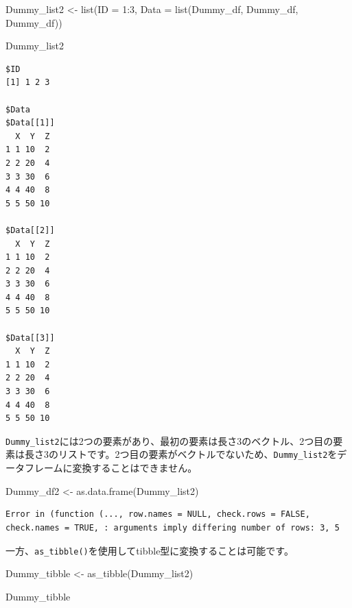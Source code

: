 \documentclass[
  a4paper,
  pandoc,
  ja=standard,
  jafont=haranoaji]{bxjsbook}
\newenvironment{Shaded}{\begin{snugshade}}{\end{snugshade}}
\newcommand{\AttributeTok}[1]{\textcolor[rgb]{0.00,0.48,0.65}{#1}}
\newcommand{\DecValTok}[1]{\textcolor[rgb]{0.68,0.00,0.00}{#1}}
\newcommand{\FunctionTok}[1]{\textcolor[rgb]{0.28,0.35,0.67}{#1}}
\newcommand{\NormalTok}[1]{\textcolor[rgb]{0.00,0.48,0.65}{#1}}
\newcommand{\OtherTok}[1]{\textcolor[rgb]{0.00,0.48,0.65}{#1}}
\newcommand{\SpecialCharTok}[1]{\textcolor[rgb]{0.37,0.37,0.37}{#1}}
\begin{document}
\begin{Shaded}
\begin{Highlighting}[numbers=left,,]
\NormalTok{Dummy\_list2 }\OtherTok{\textless{}{-}} \FunctionTok{list}\NormalTok{(}\AttributeTok{ID   =} \DecValTok{1}\SpecialCharTok{:}\DecValTok{3}\NormalTok{, }
                    \AttributeTok{Data =} \FunctionTok{list}\NormalTok{(Dummy\_df, Dummy\_df, Dummy\_df))}

\NormalTok{Dummy\_list2}
\end{Highlighting}
\end{Shaded}

\begin{verbatim}
$ID
[1] 1 2 3

$Data
$Data[[1]]
  X  Y  Z
1 1 10  2
2 2 20  4
3 3 30  6
4 4 40  8
5 5 50 10

$Data[[2]]
  X  Y  Z
1 1 10  2
2 2 20  4
3 3 30  6
4 4 40  8
5 5 50 10

$Data[[3]]
  X  Y  Z
1 1 10  2
2 2 20  4
3 3 30  6
4 4 40  8
5 5 50 10
\end{verbatim}

\texttt{Dummy\_list2}には2つの要素があり、最初の要素は長さ3のベクトル、2つ目の要素は長さ3のリストです。2つ目の要素がベクトルでないため、\texttt{Dummy\_list2}をデータフレームに変換することはできません。

\begin{Shaded}
\begin{Highlighting}[numbers=left,,]
\NormalTok{Dummy\_df2 }\OtherTok{\textless{}{-}} \FunctionTok{as.data.frame}\NormalTok{(Dummy\_list2)}
\end{Highlighting}
\end{Shaded}

\begin{verbatim}
Error in (function (..., row.names = NULL, check.rows = FALSE, check.names = TRUE, : arguments imply differing number of rows: 3, 5
\end{verbatim}

一方、\texttt{as\_tibble()}を使用してtibble型に変換することは可能です。

\begin{Shaded}
\begin{Highlighting}[numbers=left,,]
\NormalTok{Dummy\_tibble }\OtherTok{\textless{}{-}} \FunctionTok{as\_tibble}\NormalTok{(Dummy\_list2)}

\NormalTok{Dummy\_tibble}
\end{Highlighting}
\end{Shaded}
\end{document}
